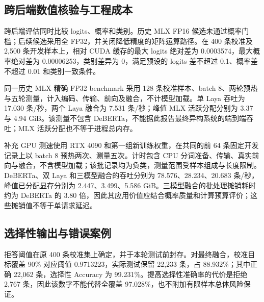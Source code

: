 \documentclass[UTF8,fontset=fandol,a4paper,11pt]{ctexart}
\begin{document}
\subsection{跨后端数值核验与工程成本}
跨后端评估同时比较 logits、概率和类别。历史 MLX FP16 候选未通过概率门槛；后续候选采用全 FP32，并关闭降低精度的矩阵运算路径。在 400 条校准及 2,500 条开发样本上，相对 CUDA 缓存的最大 logits 绝对差为 0.0003574，最大概率绝对差为 0.00006253，类别差异为 0，满足预设的 logits 差不超过 0.1、概率差不超过 0.01 和类别一致条件。

同一历史 MLX 精确 FP32 benchmark 采用 128 条校准样本、batch 8、两轮预热与五轮测量，计入编码、传输、前向及融合，不计模型加载。单 Laya 吞吐为 17.030 条/秒，两个 Laya 融合为 7.531 条/秒；峰值 MLX 活跃分配分别为 3.37 与 4.94 GiB。该测量不包含 DeBERTa，不能据此报告最终异构系统的端到端吞吐；MLX 活跃分配也不等于进程总内存。

补充 GPU 测速使用 RTX 4090 和第一组新训练权重，在共同的前 64 条固定开发记录上以 batch 8 预热两次、测量五次。计时包含 CPU 分词准备、传输、真实前向与融合，不含模型加载；该批记录均为负类，测量范围受样本组成与长度限制。DeBERTa、双 Laya 和三模型融合的吞吐分别为 78.576、28.234、20.683 条/秒，峰值已分配显存分别为 2.447、3.499、5.586 GiB。三模型融合的批处理摊销耗时约为 DeBERTa 的 3.80 倍，因此其应用价值应结合概率质量和计算预算评价；这些摊销值不等于单请求延迟。

\subsection{选择性输出与错误案例}
拒答阈值在原 400 条校准集上确定，并于本轮测试前封存。对最终融合，校准目标覆盖 90\% 对应阈值 0.9713223，实际测试保留 22,233 条，占 88.932\%；其中正确 22,062 条，选择性 Accuracy 为 99.231\%。提高选择性准确率的代价是拒绝 2,767 条，因此该数字不能代替全覆盖 97.028\%，也不附加有限样本总体风险保证。
\end{document}

